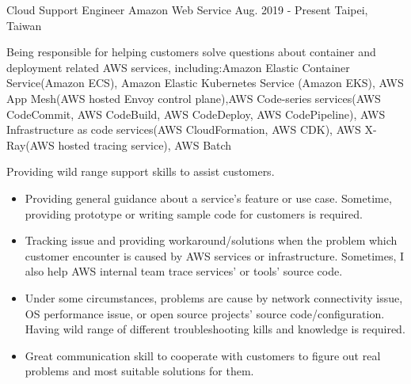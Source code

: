 

\begin{cventries}

    \cventry
        {Cloud Support Engineer}
        {Amazon Web Service}
        {Aug. 2019 - Present}
        {Taipei, Taiwan}
        {
            \begin{cvitems}
                \item
                    {
                        Being responsible for helping customers solve questions about container and deployment related AWS services, including:Amazon Elastic Container Service(Amazon ECS), Amazon Elastic Kubernetes Service (Amazon EKS), AWS App Mesh(AWS hosted Envoy control plane),AWS Code-series services(AWS CodeCommit, AWS CodeBuild, AWS CodeDeploy, AWS CodePipeline), AWS Infrastructure as code services(AWS CloudFormation, AWS CDK), AWS X-Ray(AWS hosted tracing service), AWS Batch
                    }
                \item
                    {
                        Providing wild range support skills to assist customers.
                        \begin{itemize}
                            \item Providing general guidance about a service's feature or use case. Sometime, providing prototype or writing sample code for customers is required.
                            \item Tracking issue and providing workaround/solutions when the problem which customer encounter is caused by AWS services or infrastructure. Sometimes, I also help AWS internal team trace services' or tools' source code.
                            \item Under some circumstances, problems are cause by network connectivity issue, OS performance issue, or open source projects' source code/configuration. Having wild range of different troubleshooting kills and knowledge is required.
                            \item Great communication skill to cooperate with customers to figure out real problems and most suitable solutions for them.
                        \end{itemize}
                    }
            \end{cvitems}
        }


\end{cventries}
